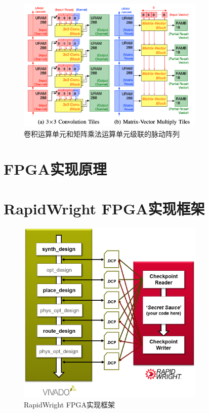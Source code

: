 \begin{figure}[h]
	\centering
	\includegraphics[width=0.8\textwidth]{figure/cascade}
	\caption{卷积运算单元和矩阵乘法运算单元级联的脉动阵列} 
	\label{fig:conv}
\end{figure}


\section{FPGA实现原理}


\section{RapidWright FPGA实现框架}

\begin{figure}[h]
	\centering
	\includegraphics[width=0.8\textwidth]{figure/vivado_dcps}
	\caption{RapidWright FPGA实现框架} 
	\label{fig:rapidwright}
\end{figure}



